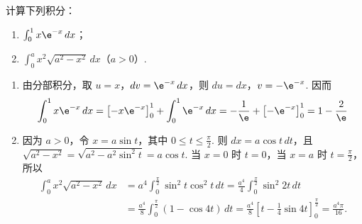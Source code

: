 \begin{problem}
计算下列积分：
\begin{enumerate}
\item \(\int_0^1 x\e^{-x}\,dx\)；
\item \(\int_0^a x^2\sqrt{a^2-x^2}\,dx\)（\(a>0\)）.
\end{enumerate}
\end{problem}

\begin{solution}
\begin{enumerate}
\item 由分部积分，取 \(u=x\)，\(dv=\e^{-x}\,dx\)，则 \(du=dx\)，\(v=-\e^{-x}\). 因而
\[
\int_0^1 x\e^{-x}\,dx
=\left[-x\e^{-x}\right]_0^1+\int_0^1\e^{-x}\,dx
=-\frac1{\e}+\left[-\e^{-x}\right]_0^1
=1-\frac2{\e}
\]

\item 因为 \(a>0\)，令 \(x=a\sin t\)，其中 \(0\le t\le\frac\pi2\). 则 \(dx=a\cos t\,dt\)，且
\(\sqrt{a^2-x^2}=\sqrt{a^2-a^2\sin^2t}=a\cos t\). 当 \(x=0\) 时 \(t=0\)，当 \(x=a\) 时 \(t=\frac\pi2\)，所以
\[
\begin{aligned}
\int_0^a x^2\sqrt{a^2-x^2}\,dx
&=a^4\int_0^{\frac\pi2}\sin^2t\cos^2t\,dt
=\frac{a^4}{4}\int_0^{\frac\pi2}\sin^2 2t\,dt\\
&=\frac{a^4}{8}\int_0^{\frac\pi2}(1-\cos4t)\,dt
=\frac{a^4}{8}\left[t-\frac14\sin4t\right]_0^{\frac\pi2}
=\frac{a^4\pi}{16}.
\end{aligned}
\]
\end{enumerate}
\end{solution}
